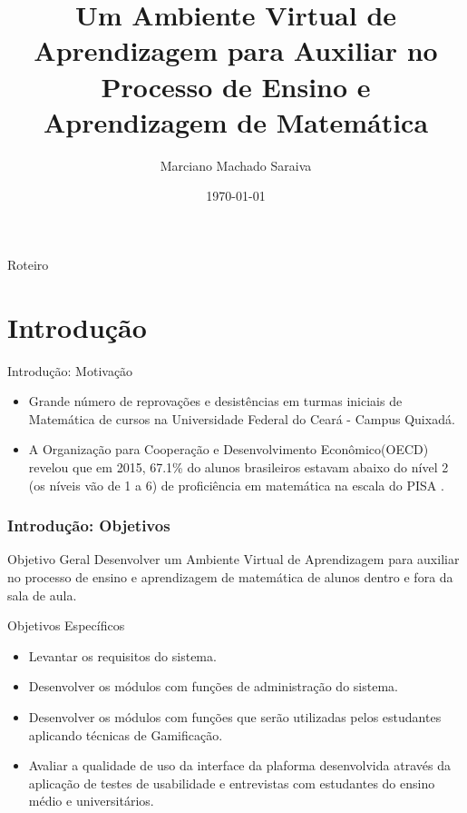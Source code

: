 \documentclass[aspectratio=169]{beamer}
\title{Um Ambiente Virtual de Aprendizagem para Auxiliar no Processo de Ensino e Aprendizagem de Matemática}
\author[]{Marciano Machado Saraiva}
\institute{
Orientador: Prof. Me. Samy Soares Passos de Sá\\[2 ex]
Universidade Federal do Ceará
	    \par
	    Bacharel em Sistemas de Informação}
\date{\today}
\begin{document}
\begin{frame}

    \titlepage

\end{frame}

\begin{frame}{Roteiro}
	\tableofcontents
\end{frame}

\section{Introdução}

\begin{frame}{Introdução: Motivação}

\begin{itemize}
	\item Grande número de reprovações e desistências em turmas iniciais de Matemática de cursos na Universidade Federal do Ceará - Campus 
Quixadá.
	\item A Organização para Cooperação e Desenvolvimento Econômico(OECD) revelou que em 2015, 67.1\% do alunos brasileiros estavam abaixo 
do nível 2 (os níveis vão de 1 a 6) de proficiência em matemática na escala do PISA \cite{pisainfocus2016}.

\end{itemize}

\end{frame}

\begin{frame}
\frametitle{Introdução: Objetivos}

\begin{block}{Objetivo Geral}
	Desenvolver um Ambiente Virtual de Aprendizagem para auxiliar no processo de ensino e aprendizagem de matemática de alunos dentro e fora da sala de aula.
	\pause
\end{block}

\begin{block}{Objetivos Específicos}

\begin{itemize}
  \item Levantar os requisitos do sistema.
  \pause
  \item Desenvolver os módulos com funções de administração do sistema.
  \pause
  \item Desenvolver os módulos com funções que serão utilizadas pelos estudantes aplicando técnicas de Gamificação.
  \pause
  \item Avaliar a qualidade de uso da interface da plaforma desenvolvida através da aplicação de testes de usabilidade e entrevistas com estudantes do ensino médio e universitários.
\end{itemize}

\end{block}

\end{frame}
\end{document}
